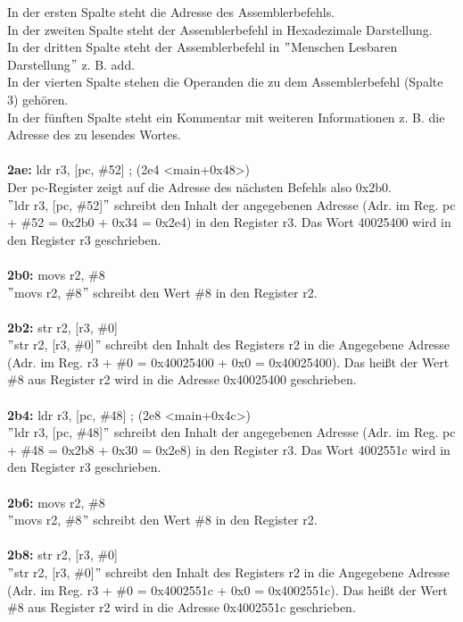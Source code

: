 In der ersten Spalte steht die Adresse des Assemblerbefehls.\\
In der zweiten Spalte steht der Assemblerbefehl in Hexadezimale Darstellung.\\
In der dritten Spalte steht der Assemblerbefehl in $"$Menschen Lesbaren Darstellung$"$ z. B. add.\\
In der vierten Spalte stehen die Operanden die zu dem Assemblerbefehl (Spalte 3) gehören.\\
In der fünften Spalte steht ein Kommentar mit weiteren Informationen z. B. die Adresse des zu lesendes Wortes.\\ \\
\textbf{2ae:} ldr r3, [pc, \#52] ; (2e4 <main+0x48>)\\
Der pc-Register zeigt auf die Adresse des nächsten Befehls also 0x2b0.\\
$"$ldr r3, [pc, \#52]$"$ schreibt den Inhalt der angegebenen Adresse (Adr. im Reg. pc + \#52 = 0x2b0 + 0x34 = 0x2e4) in den Register r3. Das Wort 40025400 wird in den Register r3 geschrieben.\\ \\
\textbf{2b0:} movs r2, \#8\\
$"$movs r2, \#8$"$ schreibt den Wert \#8 in den Register r2.\\ \\
\textbf{2b2:} str r2, [r3, \#0]\\
$"$str r2, [r3, \#0]$"$ schreibt den Inhalt des Registers r2 in die Angegebene Adresse (Adr. im Reg. r3 + \#0 = 0x40025400 + 0x0 = 0x40025400). Das hei\ss{}t der Wert \#8 aus Register r2 wird in die Adresse 0x40025400 geschrieben.\\ \\
\textbf{2b4:} ldr r3, [pc, \#48] ; (2e8 <main+0x4c>)\\
$"$ldr r3, [pc, \#48]$"$ schreibt den Inhalt der angegebenen Adresse (Adr. im Reg. pc + \#48 = 0x2b8 + 0x30 = 0x2e8) in den Register r3. Das Wort 4002551c wird in den Register r3 geschrieben.\\ \\
\textbf{2b6:} movs r2, \#8\\
$"$movs r2, \#8$"$ schreibt den Wert \#8 in den Register r2.\\ \\
\textbf{2b8:} str r2, [r3, \#0]\\
$"$str r2, [r3, \#0]$"$ schreibt den Inhalt des Registers r2 in die Angegebene Adresse (Adr. im Reg. r3 + \#0 = 0x4002551c + 0x0 = 0x4002551c). Das hei\ss{}t der Wert \#8 aus Register r2 wird in die Adresse 0x4002551c geschrieben.\\ \\
